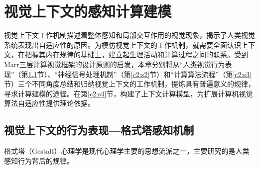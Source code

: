 \chapter{视觉上下文的感知计算建模}
\label{c2}
视觉上下文工作机制描述着整体感知和局部交互作用的视觉现象，揭示了人类视觉系统表现出自适应性的原因。为模仿视觉上下文的工作机制，就需要全面认识上下文，在把握其内在规律的基础上，建立起生理活动和计算过程之间的联系。受到Marr三层计算视觉框架的设计原则的启发，本章分别将从“人类视觉行为表现”（第\ref{c2:s1}节）、“神经信号处理机制”（第\ref{c2:s2}节）和“计算算法流程”（第\ref{c2:s3}节）三个不同角度{总结和归纳}视觉上下文的工作机制，{提炼}具有普遍意义的规律，{寻求}计算建模的途径。在第\ref{c2:s4}节，{构建了}上下文计算模型，为扩展计算机视觉算法自适应性{提供理论依据}。



\section{视觉上下文的行为表现---格式塔感知机制}
\label{c2:s1}

格式塔（Gestalt）心理学是现代心理学主要的思想流派之一，主要研究的是人类感知行为背后的规律。